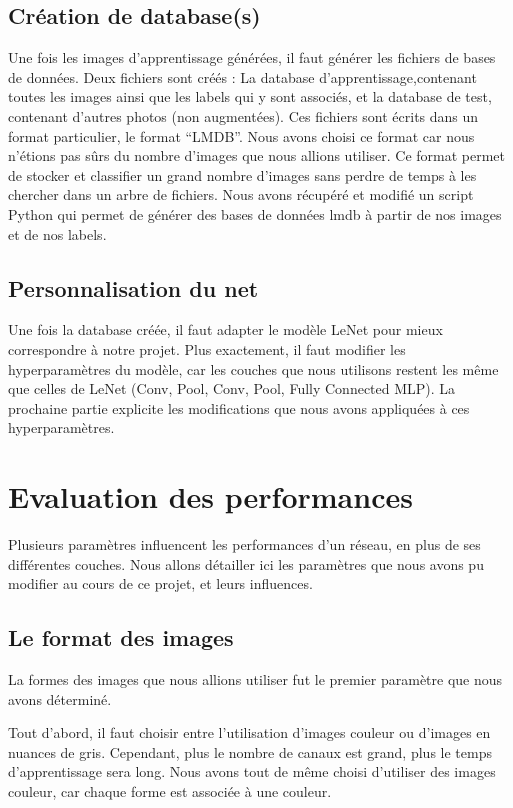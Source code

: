\documentclass[a4paper,12pt]{article}
\begin{document}
  \subsection{Création de database(s)}
    Une fois les images d'apprentissage générées, il faut générer les fichiers de bases de données. Deux fichiers sont créés : La database d'apprentissage,contenant toutes les images ainsi que les labels qui y sont associés, et la database de test, contenant d'autres photos (non augmentées). Ces fichiers sont écrits dans un format particulier, le format ``LMDB''. Nous avons choisi ce format car nous n'étions pas sûrs du nombre d'images que nous allions utiliser. Ce format permet de stocker et classifier un grand nombre d'images sans perdre de temps à les chercher dans un arbre de fichiers. Nous avons récupéré et modifié un script Python qui permet de générer des bases de données lmdb à partir de nos images et de nos labels.
  
  \subsection{Personnalisation du net}
    Une fois la database créée, il faut adapter le modèle LeNet pour mieux correspondre à notre projet. Plus exactement, il faut modifier les hyperparamètres du modèle, car les couches que nous utilisons restent les même que celles de LeNet (Conv, Pool, Conv, Pool, Fully Connected MLP). La prochaine partie explicite les modifications que nous avons appliquées à ces hyperparamètres.

\newpage
\section{Evaluation des performances}
  Plusieurs paramètres influencent les performances d'un réseau, en plus de ses différentes couches. Nous allons détailler ici les paramètres que nous avons pu modifier au cours de ce projet, et leurs influences.
  \subsection{Le format des images}
    La formes des images que nous allions utiliser fut le premier paramètre que nous avons déterminé. 
    
    Tout d'abord, il faut choisir entre l'utilisation d'images couleur ou d'images en nuances de gris. Cependant, plus le nombre de canaux est grand, plus le temps d'apprentissage sera long. Nous avons tout de même choisi d'utiliser des images couleur, car chaque forme est associée à une couleur. 
\end{document}

